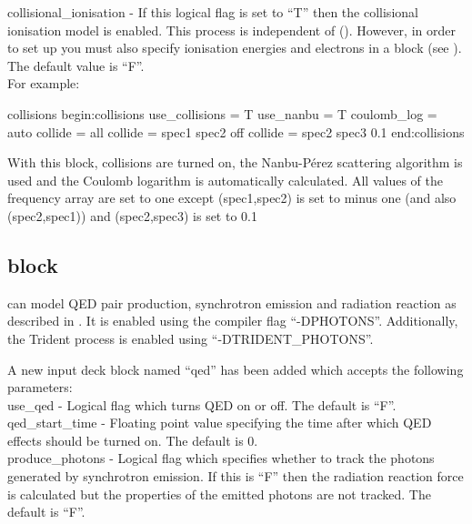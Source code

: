{\emphtext collisional\_ionisation} - If this logical flag is set to ``T''
  then the collisional ionisation model is enabled. This process is independent
  of  (). However, in order to
  set up 
  you must also specify ionisation energies and electrons in a
   block (see ). The default value
  is ``F''.\\

For example:

\begin{lboxverbatim}{collisions}
begin:collisions
   use_collisions = T
   use_nanbu = T
   coulomb_log = auto
   collide = all
   collide = spec1 spec2 off
   collide = spec2 spec3 0.1
end:collisions
\end{lboxverbatim}

  With this block, collisions are turned on, the Nanbu-P\'erez scattering
  algorithm is used and the Coulomb logarithm is
  automatically calculated. All values of the frequency array are set
  to one except (spec1,spec2) is set to minus one (and also (spec2,spec1))
  and (spec2,spec3) is set to 0.1


\subsection{\texorpdfstring
  { block}
  {           {qed} block}}
\label{sec:qed_block}

{\EPOCH} can model QED pair production, synchrotron emission and
radiation reaction as described in \citet{Duclous}.
It is enabled using the compiler flag ``-DPHOTONS''. Additionally,
the Trident process is enabled using ``-DTRIDENT\_PHOTONS''.

A new input deck block named ``qed'' has been added which accepts the
following parameters:\\

{\emphtext use\_qed} - Logical flag which turns QED on or off. The default
  is ``F''.\\

{\emphtext qed\_start\_time} - Floating point value specifying the time after
  which QED effects should be turned on. The default is 0.\\

{\emphtext produce\_photons} - Logical flag which specifies whether to track
  the photons generated by synchrotron emission. If this is ``F'' then the
  radiation reaction force is calculated but the properties of the emitted
  photons are not tracked. The default is ``F''.\\

